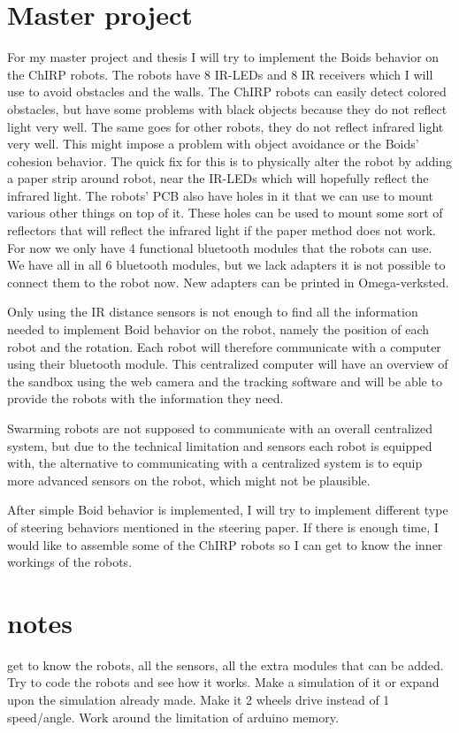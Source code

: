 \section{Master project}
For my master project and thesis I will try to implement the Boids behavior on the ChIRP robots. The robots have 8 IR-LEDs and 8 IR receivers which I will use to avoid obstacles and the walls. The ChIRP robots can easily detect colored obstacles, but have some problems with black objects because they do not reflect light very well. The same goes for other robots, they do not reflect infrared light very well. This might impose a problem with object avoidance or the Boids' cohesion behavior. The quick fix for this is to physically alter the robot by adding a paper strip around robot, near the IR-LEDs which will hopefully reflect the infrared light.
The robots' PCB also have holes in it that we can use to mount various other things on top of it. These holes can be used to mount some sort of reflectors that will reflect the infrared light if the paper method does not work.
For now we only have 4 functional bluetooth modules that the robots can use. We have all in all 6 bluetooth modules, but we lack adapters it is not possible to connect them to the robot now. New adapters can be printed in Omega-verksted. 


Only using the IR distance sensors is not enough to find all the information needed to implement Boid behavior on the robot, namely the position of each robot and the rotation.
Each robot will therefore communicate with a computer using their bluetooth module.
This centralized computer will have an overview of the sandbox using the web camera and the tracking software and will be able to provide the robots with the information they need.

Swarming robots are not supposed to communicate with an overall centralized system, but due to the technical limitation and sensors each robot is equipped with, the alternative to communicating with a centralized system is to equip more advanced sensors on the robot, which might not be plausible.

After simple Boid behavior is implemented, I will try to implement different type of steering behaviors mentioned in the steering paper. If there is enough time, I would like to assemble some of the ChIRP robots so I can get to know the inner workings of the robots.
\section{notes}
get to know the robots, all the sensors, all the extra modules that can be added.
Try to code the robots and see how it works. Make a simulation of it or expand upon the simulation already made. Make it 2 wheels drive instead of 1 speed/angle.
Work around the limitation of arduino memory.
